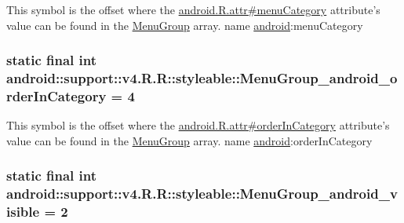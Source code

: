 This symbol is the offset where the \hyperlink{}{android.R.attr\#menuCategory} attribute's value can be found in the \hyperlink{classandroid_1_1support_1_1v4_1_1_r_1_1styleable_ba730c6d04433f7e2cb2ad1dd3b251a3}{MenuGroup} array.  name \hyperlink{namespaceandroid}{android}:menuCategory \hypertarget{classandroid_1_1support_1_1v4_1_1_r_1_1styleable_a2bd4e8b65f7ef482c13b6325dcc3878}{
\subsubsection[{MenuGroup\_\-android\_\-orderInCategory}]{\setlength{\rightskip}{0pt plus 5cm}static final int android::support::v4.R.R::styleable::MenuGroup\_\-android\_\-orderInCategory = 4}}
\label{classandroid_1_1support_1_1v4_1_1_r_1_1styleable_a2bd4e8b65f7ef482c13b6325dcc3878}


This symbol is the offset where the \hyperlink{}{android.R.attr\#orderInCategory} attribute's value can be found in the \hyperlink{classandroid_1_1support_1_1v4_1_1_r_1_1styleable_ba730c6d04433f7e2cb2ad1dd3b251a3}{MenuGroup} array.  name \hyperlink{namespaceandroid}{android}:orderInCategory \hypertarget{classandroid_1_1support_1_1v4_1_1_r_1_1styleable_e6b2370a519554c52dd6d1cfe33eccd4}{
\subsubsection[{MenuGroup\_\-android\_\-visible}]{\setlength{\rightskip}{0pt plus 5cm}static final int android::support::v4.R.R::styleable::MenuGroup\_\-android\_\-visible = 2}}
\label{classandroid_1_1support_1_1v4_1_1_r_1_1styleable_e6b2370a519554c52dd6d1cfe33eccd4}


